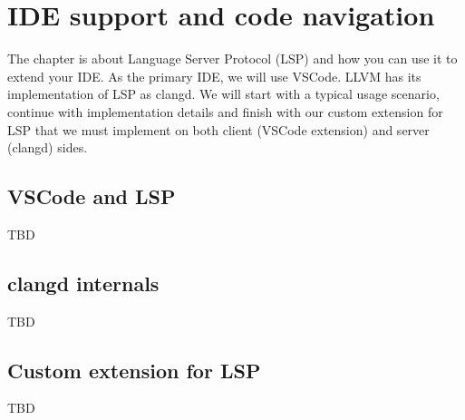 \chapter{\textbf{IDE support and code navigation}}
\pagestyle{fancy}
\fancyhf{}
\rhead{\thepage}

 The chapter is about Language Server Protocol (LSP) and how you can use it to
 extend your IDE. As the primary IDE, we will use VSCode. LLVM has its
 implementation of LSP as clangd. We will start with a typical usage scenario,
 continue with implementation details and finish with our custom extension for
 LSP that we must implement on both client (VSCode extension) and server
 (clangd) sides. 

 \label{ch:clangd}
 
\section{VSCode and LSP}
TBD

\section{clangd internals}
TBD

\section{Custom extension for LSP}
TBD
